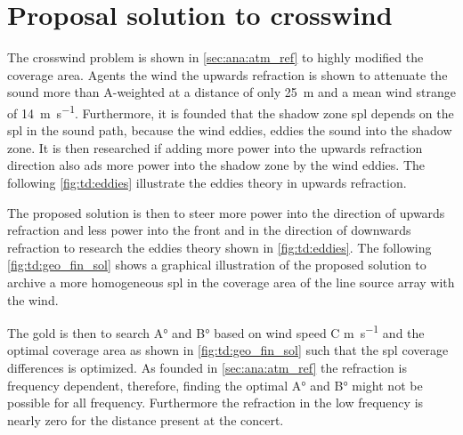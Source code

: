 \section{Proposal solution to crosswind}\label{sec:des:pro_cross}
The crosswind problem is shown in \autoref{sec:ana:atm_ref} to highly modified the coverage area. Agents the wind the upwards refraction is shown to attenuate the sound more than  A-weighted at a distance of only \SI{25}{\meter} and a mean wind strange of \SI{14}{\meter\per\second}. Furthermore, it is founded that the shadow zone \gls{spl} depends on the \gls{spl} in the sound path, because the wind eddies, eddies the sound into the shadow zone. It is then researched if adding more power into the upwards refraction direction also ads more power into the shadow zone by the wind eddies. The following \autoref{fig:td:eddies} illustrate the eddies theory in upwards refraction.


The proposed solution is then to steer more power into the direction of upwards refraction and less power into the front and in the direction of downwards refraction to research the eddies theory shown in \autoref{fig:td:eddies}. The following \autoref{fig:td:geo_fin_sol} shows a graphical illustration of the proposed solution to archive a more homogeneous \gls{spl} in the coverage area of the line source array with the wind.


The gold is then to search A\si{\degree} and B\si{\degree} based on wind speed C \si{\meter\per\second} and the optimal coverage area as shown in \autoref{fig:td:geo_fin_sol} such that the \gls{spl} coverage differences is optimized. As founded in \autoref{sec:ana:atm_ref} the refraction is frequency dependent, therefore, finding the optimal  A\si{\degree} and B\si{\degree} might not be possible for all frequency. Furthermore the refraction in the low frequency is nearly zero for the distance present at the concert. 




